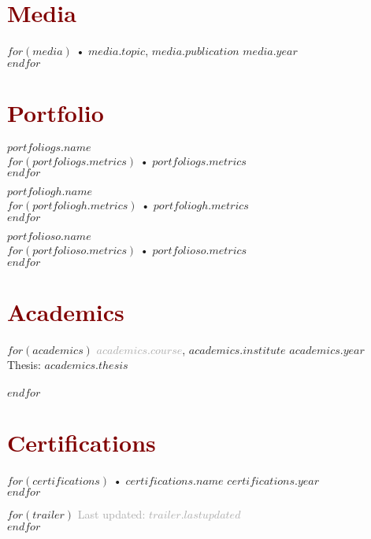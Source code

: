 \documentclass[$fontsize$, a4paper]{article}
\begin{document}
\section*{\textcolor{Maroon}{Media}}
$for(media)$
  • $media.topic$, \href{$media.url$}{$media.publication$} \hfill $media.year$\\
$endfor$

\section*{\textcolor{Maroon}{Portfolio}}
\begin{multicols}{3}
  \textcolor{darkgray}{} \href{$portfoliogs.url$}{$portfoliogs.name$}\\
  $for(portfoliogs.metrics)$
    • $portfoliogs.metrics$\\
  $endfor$

\columnbreak
  \textcolor{darkgray}{} \href{$portfoliogh.url$}{$portfoliogh.name$}\\
  $for(portfoliogh.metrics)$
    • $portfoliogh.metrics$\\
  $endfor$

\columnbreak
  \textcolor{darkgray}{} \href{$portfolioso.url$}{$portfolioso.name$}\\
  $for(portfolioso.metrics)$
    • $portfolioso.metrics$\\
  $endfor$
\end{multicols}

\section*{\textcolor{Maroon}{Academics}}
$for(academics)$
  \textcolor{darkgray}{\textbf{$academics.course$}}, \textbf{\href{$academics.url$}{$academics.institute$}} \hfill $academics.year$\\
  Thesis: \href{$academics.thesis_url$}{$academics.thesis$}\\
  \\[.05cm]
$endfor$

\section*{\textcolor{Maroon}{Certifications}}
$for(certifications)$
  • \href{$certifications.url$}{$certifications.name$} \hfill $certifications.year$\\
$endfor$

\vspace{1cm}
$for(trailer)$
  \footnotesize{\textcolor{darkgray}{Last updated: $trailer.lastupdated$}}\\
$endfor$
\end{document}
